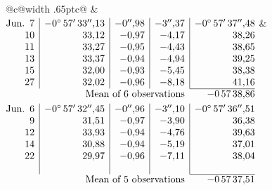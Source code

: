 \noindent\begin{tabular}{@{}c@{\hspace{.4em}\vrule width .65pt\hspace{.4em}}c@{}}
 &
 \\[.18ex]
\(\begin{array}[t]{@{}r|r|r|r|r@{}}
\text{Jun.}\enspace 7 & -0^\circ\,57'\,33''{,}13 & -0''{,}98 & -3''{,}37 & -0^\circ\,57'\,37''{,}48\\
10 & 33{,}12 & -0{,}97 & -4{,}17 & 38{,}26\\
11 & 33{,}27 & -0{,}95 & -4{,}43 & 38{,}65\\
13 & 33{,}37 & -0{,}94 & -4{,}94 & 39{,}25\\
15 & 32{,}00 & -0{,}93 & -5{,}45 & 38{,}38\\
27 & 32{,}02 & -0{,}96 & -8{,}18 & 41{,}16\\
\cline{5-5}
\multicolumn{4}{r}{\text{Mean of 6 observations}} & -0\,57\,38{,}86
\end{array}\)
&
\(\begin{array}[t]{@{}r|r|r|r|r@{}}
\text{Jun.}\enspace 6 & -0^\circ\,57'\,32''{,}45 & -0''{,}96 & -3''{,}10 & -0^\circ\,57'\,36''{,}51\\
9 & 31{,}51 & -0{,}97 & -3{,}90 & 36{,}38\\
12 & 33{,}93 & -0{,}94 & -4{,}76 & 39{,}63\\
14 & 30{,}88 & -0{,}94 & -5{,}19 & 37{,}01\\
22 & 29{,}97 & -0{,}96 & -7{,}11 & 38{,}04\\
 & & & & \\
\cline{5-5}
\multicolumn{4}{r}{\text{Mean of 5 observations}} & -0\,57\,37{,}51
\end{array}\)
\end{tabular}\par\medskip
{}
